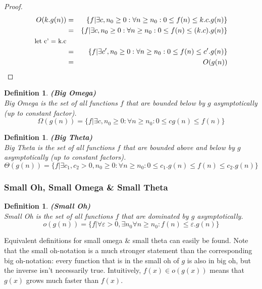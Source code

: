 \documentclass[a4paper,11pt]{article}
\newtheorem{definition}[theorem]{Definition}
\begin{document}
\begin{proof}
\begin{eqnarray*}
O(k.g(n)) &=& \{f|\exists c, n_0 \geq 0: \forall n \geq n_0 : 0 \leq f(n) \leq k.c.g(n)\}\\
&=& \{f|\exists c, n_0 \geq 0: \forall n \geq n_0 : 0 \leq f(n) \leq (k.c).g(n)\}\\
\text{\small{let c' = k.c}}\\
&=& \{f|\exists c', n_0 \geq 0: \forall n \geq n_0 : 0 \leq f(n) \leq c'.g(n)\}\\
&=& O(g(n))
\end{eqnarray*}
\end{proof}


\begin{definition}\textbf{(Big Omega)}\cite{11}\\
Big Omega is the set of all functions $f$ that are bounded below by $g$ asymptotically (up to constant factor).
$$\Omega(g(n)) = \{f|\exists c, n_0 \geq 0: \forall n \geq n_0 : 0 \leq  cg(n)  \leq f(n) \}$$
\end{definition}
\begin{definition}\textbf{(Big Theta)}\cite{11}\\
Big Theta is the set of all functions $f$ that are bounded above and below by $g$ asymptotically (up to constant factors).
$$\Theta(g(n)) = \{f|\exists c_1, c_2 > 0, n_0 \geq 0: \forall n \geq n_0 : 0 \leq  c_1.g(n)  \leq f(n) \leq c_2.g(n)\}$$
\end{definition}

\subsubsection{Small Oh, Small Omega \& Small Theta}
\begin{definition}\textbf{(Small Oh)}\cite{12}\\
Small Oh is the set of all functions $f$ that are dominated by $g$ asymptotically.
$$o(g(n)) = \{f|\forall \varepsilon > 0, \exists n_0 \forall n \geq n_0: f(n) \leq \varepsilon.g(n)\}$$
\end{definition}
Equivalent definitions for small omega \& small theta can easily be found.  Note that the small oh-notation is a much stronger statement than the corresponding big oh-notation: every function that is in the small oh of $g$ is also in big oh, but the inverse isn't necessarily true. Intuitively, $f(x) \in o(g(x))$ means that $g(x)$ grows much faster than $f(x)$.
\end{document}
